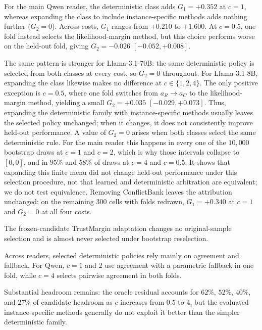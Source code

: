 \documentclass[sigconf]{acmart}
\newcommand{\ac}{a_C}
\newcommand{\ar}{a_R}
\begin{document}
For the main Qwen reader, the deterministic class adds
$G_1=+0.352$ at $c{=}1$, whereas expanding the class to include
instance-specific methods adds nothing further ($G_2=0$). Across costs,
$G_1$ ranges from $+0.210$ to $+1.600$. At $c{=}0.5$, one fold instead
selects the likelihood-margin method, but this choice performs worse on
the held-out fold, giving $G_2=-0.026$
$[-0.052,\allowbreak +0.008]$.

The same pattern is stronger for Llama-3.1-70B: the same deterministic
policy is selected from both classes at every cost, so $G_2=0$
throughout. For Llama-3.1-8B, expanding the class likewise makes no
difference at $c\in\{1,2,4\}$. The only positive exception is
$c{=}0.5$, where one fold switches from $\ar{\to}\ac$ to the
likelihood-margin method, yielding a small $G_2=+0.035$
$[-0.029,\allowbreak +0.073]$. Thus, expanding the deterministic family
with instance-specific methods usually leaves the selected policy
unchanged; when it changes, it does not consistently improve held-out
performance.
A value of $G_2=0$ arises when both classes select the same
deterministic rule. For the main reader this happens in every one of
the $10{,}000$ bootstrap draws at $c{=}1$ and $c{=}2$, which is why
those intervals collapse to $[0,0]$, and in $95\%$ and $58\%$ of draws
at $c{=}4$ and $c{=}0.5$. It shows that expanding this finite menu did
not change held-out performance under this selection procedure, not
that learned and deterministic arbitration are equivalent; we do not
test equivalence.
Removing ConflictBank leaves the attribution unchanged: on the
remaining $300$ cells with folds redrawn, $G_1=+0.340$ at $c{=}1$ and
$G_2=0$ at all four costs.

The frozen-candidate TrustMargin adaptation changes no original-sample
selection and is almost never selected under bootstrap reselection.

Across readers, selected deterministic policies rely mainly on
agreement and fallback. For Qwen, $c{=}1$ and $2$ use agreement with a
parametric fallback in one fold, while $c{=}4$ selects pairwise
agreement in both folds.

Substantial headroom remains: the oracle residual accounts for $62\%$,
$52\%$, $40\%$, and $27\%$ of candidate headroom as $c$ increases from
$0.5$ to $4$, but the evaluated instance-specific methods generally do
not exploit it better than the simpler deterministic family.
\end{document}

